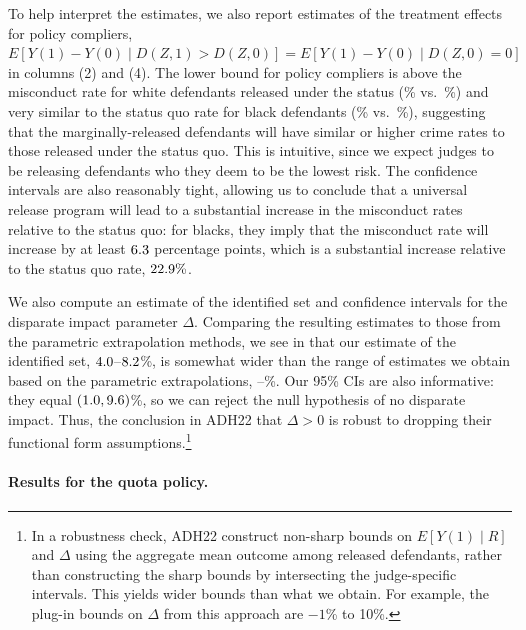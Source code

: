 \documentclass[12pt]{article}%
\theoremstyle{definition}
\newcommand\1{\operatorname{I}\indicatorfence}
\begin{document}
To help interpret the estimates, we also report estimates of the treatment
effects for policy compliers,
$E[Y(1)-Y(0)\mid D(Z,1)>D(Z,0)]=E[Y(1)-Y(0)\mid D(Z,0)=0]$ in columns (2) and
(4). The lower bound for policy compliers is above the misconduct rate for white
defendants released under the status (\nycPCTElw\% vs.\ \nycEYwD\%) and very similar to the status quo rate for black defendants (\nycPCTElb\% vs.\ \nycEYbD\%), suggesting that the marginally-released defendants will have similar or higher crime rates to those released under the status quo. This is intuitive, since we expect judges to be releasing defendants who they deem to
be the lowest risk. The confidence intervals are also reasonably tight, allowing us
to conclude that a universal release program will lead to a substantial increase
in the misconduct rates relative to the status quo: for blacks, they imply that
the misconduct rate will increase by at least $6.3$ percentage
points, which is a substantial increase relative to the status quo rate, $22.9\%$.

We also compute an estimate of the identified set and confidence intervals for
the disparate impact parameter $\Delta$. Comparing the resulting estimates to
those from the parametric extrapolation methods, we see in
 that our estimate of the identified set,
$4.0$--$8.2$\%, is somewhat wider than the range of estimates we
obtain based on the parametric extrapolations, \nycDeltalp--\nycDeltaup\%. Our
95\% CIs are also informative: they equal $(1.0, 9.6)$\%, so we
can reject the null hypothesis of no disparate impact. Thus, the conclusion in
ADH22 that $\Delta > 0$ is robust to dropping their functional form
assumptions.\footnote{In a robustness check, ADH22 construct non-sharp bounds on
  $E[Y(1) \mid R]$ and $\Delta$ using the aggregate mean outcome among released
  defendants, rather than constructing the sharp bounds by intersecting the
  judge-specific intervals. This yields wider bounds than what we obtain. For
  example, the plug-in bounds on $\Delta$ from this approach are $-1$\% to
  10\%.}

\paragraph{Results for the quota policy.}
\end{document}
